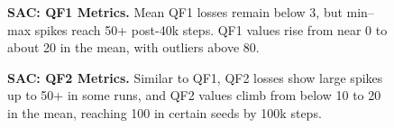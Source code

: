 \begin{figure}[htbp]
	\centering
	\caption{\textbf{SAC: QF1 Metrics.}
		Mean QF1 losses remain below 3, but min--max spikes reach 50+ post-40k steps. 
		QF1 values rise from near 0 to about 20 in the mean, with outliers above 80.}
	\label{fig:sac_q_metrics_1}
\end{figure}

\begin{figure}[htbp]
	\centering
	\quad
	\caption{\textbf{SAC: QF2 Metrics.}
		Similar to QF1, QF2 losses show large spikes up to 50+ in some runs, 
		and QF2 values climb from below 10 to 20 in the mean, 
		reaching 100 in certain seeds by 100k steps.}
	\label{fig:sac_q_metrics_2}
\end{figure}

